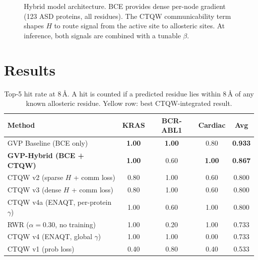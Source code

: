 \documentclass[11pt,a4paper]{article}
\begin{document}
\begin{figure}[H]
\caption{Hybrid model architecture. BCE provides dense per-node gradient
(123 ASD proteins, all residues). The CTQW communicability term shapes $H$
to route signal from the active site to allosteric sites. At inference,
both signals are combined with a tunable $\beta$.}
\end{figure}

\section{Results}

\begin{table}[H]
\centering
\setlength{\tabcolsep}{8pt}
\begin{tabular}{lcccc}
\toprule
\textbf{Method} & \textbf{KRAS} & \textbf{BCR-ABL1} & \textbf{Cardiac} & \textbf{Avg} \\
\midrule
GVP Baseline (BCE only)          & \textbf{1.00} & \textbf{1.00} & 0.80 & \textbf{0.933} \\
\rowcolor{cBestRow}
\textbf{GVP-Hybrid (BCE + CTQW)} & \textbf{1.00} & 0.60          & \textbf{1.00} & \textbf{0.867} \\
CTQW v2 (sparse $H$ + comm loss)  & 0.80 & 1.00 & 0.60 & 0.800 \\
CTQW v3 (dense $H$ + comm loss)   & 0.80 & 1.00 & 0.60 & 0.800 \\
CTQW v4a (ENAQT, per-protein $\gamma$) & 1.00 & 0.60 & 1.00 & 0.800 \\
RWR ($\alpha=0.30$, no training)  & 1.00 & 0.20 & 1.00 & 0.733 \\
CTQW v4 (ENAQT, global $\gamma$)  & 1.00 & 1.00 & 0.00 & 0.733 \\
CTQW v1 (prob loss)               & 0.40 & 0.80 & 0.40 & 0.533 \\
\bottomrule
\end{tabular}
\caption{Top-5 hit rate at 8\,\r{A}. A hit is counted if a predicted residue
lies within 8\,\r{A} of any known allosteric residue.
Yellow row: best CTQW-integrated result.}
\end{table}
\end{document}
